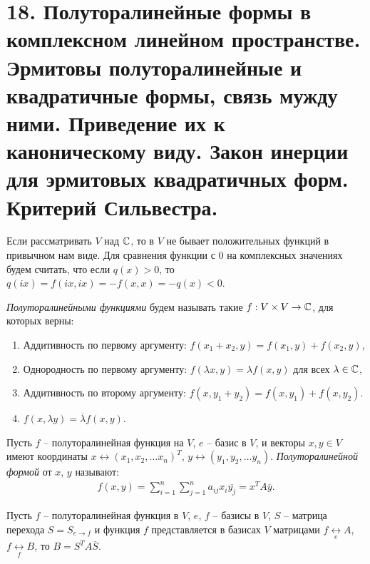 \section{18. Полуторалинейные формы в комплексном линейном пространстве. Эрмитовы полуторалинейные и квадратичные формы, связь мужду ними. Приведение их к каноническому виду. Закон инерции для эрмитовых квадратичных форм. Критерий Сильвестра.}

\begin{definition}
    Если рассматривать $V$ над $\mathbb{C}$, то в $V$ не бывает положительных функций в привычном нам виде.
    Для сравнения функции с $0$ на комплексных значениях будем считать, что если  $q(x) > 0$, то 
    $q(ix) = f(ix, ix) = -f(x,x) = -q(x) < 0$.
\end{definition}

\begin{definition}
    \textit{Полуторалинейными функциями} будем называть такие $f: V \times V \to \mathbb{C}$, для которых верны: 
    \begin{enumerate}
        \item Аддитивность по первому аргументу: $f(x_1 + x_2, y) = f(x_1, y) + f(x_2, y)$,
        \item Однородность по первому аргументу: $f(\lambda x, y) = \lambda f(x, y)$ для всех $\lambda \in \mathbb{C}$,
        \item Аддитивность по второму аргументу: $f(x, y_1 + y_2) = f(x, y_1) + f(x, y_2)$.
        \item $f(x, \lambda y) = \overline{\lambda} f(x, y)$.
    \end{enumerate}
\end{definition}

\begin{definition}
    Пусть $f$ -- полуторалинейная функция на $V$, $e$ -- базис в $V$, и векторы $x, y \in V$ имеют 
    координаты $x \leftrightarrow (x_1, x_2, \dots x_n)^T$, $y \leftrightarrow (y_1, y_2, \dots y_n)$.
    \textit{Полуторалинейной формой} от $x$, $y$ называют:
    \begin{gather*}
        f(x, y) = \sum_{i=1}^{n} \sum_{j=1}^{n} a_{ij} x_i \overline{y_j} = x^T A \overline{y}.
    \end{gather*} 
\end{definition}

\begin{proposition}
    Пусть $f$ -- полуторалинейная функция в $V$, $e$, $f$ -- базисы в $V$, $S$ -- матрица перехода 
    $S = S_{e \to f}$ и функция $f$ представляется в базисах $V$ матрицами
    $f \underset{e}{\leftrightarrow} A$, $f  \underset{f}{\leftrightarrow} B$, то $B = S^T A \overline{S}$.
\end{proposition}

